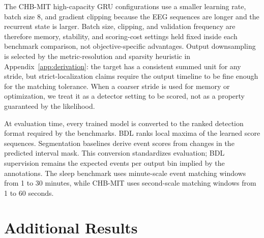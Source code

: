 The CHB-MIT high-capacity GRU configurations use a smaller learning rate, batch size 8, and gradient clipping because the EEG sequences are longer and the recurrent state is larger.
Batch size, clipping, and validation frequency are therefore memory, stability, and scoring-cost settings held fixed inside each benchmark comparison, not objective-specific advantages.
Output downsampling is selected by the metric-resolution and sparsity heuristic in Appendix~\ref{app:derivation}: the target has a consistent summed unit for any stride, but strict-localization claims require the output timeline to be fine enough for the matching tolerance.
When a coarser stride is used for memory or optimization, we treat it as a detector setting to be scored, not as a property guaranteed by the likelihood.

\begin{center}
\centering
\label{tab:core-protocol}
\end{center}

At evaluation time, every trained model is converted to the ranked detection format required by the benchmarks.
BDL ranks local maxima of the learned score sequences.
Segmentation baselines derive event scores from changes in the predicted interval mask.
This conversion standardizes evaluation; BDL supervision remains the expected events per output bin implied by the annotations.
The sleep benchmark uses minute-scale event matching windows from 1 to 30 minutes, while CHB-MIT uses second-scale matching windows from 1 to 60 seconds.

\section{Additional Results}
\label{app:additional-results}

